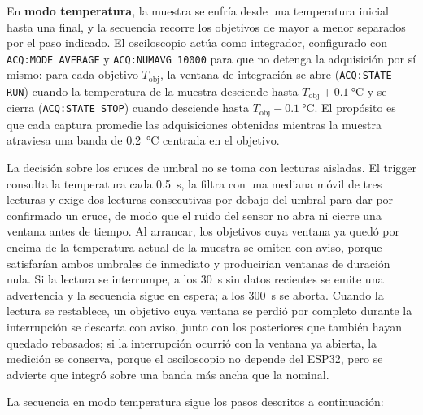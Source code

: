 En \textbf{modo temperatura}, la muestra se enfría desde una
temperatura inicial hasta una final, y la secuencia recorre los
objetivos de mayor a menor separados por el paso indicado. El
osciloscopio actúa como integrador, configurado con
\texttt{ACQ:MODE AVERAGE} y \texttt{ACQ:NUMAVG 10000} para que no
detenga la adquisición por sí mismo: para cada objetivo
$T_\text{obj}$, la ventana de integración se abre
(\texttt{ACQ:STATE RUN}) cuando la temperatura de la muestra desciende
hasta $T_\text{obj} + \SI{0.1}{\celsius}$ y se cierra
(\texttt{ACQ:STATE STOP}) cuando desciende hasta
$T_\text{obj} - \SI{0.1}{\celsius}$. El propósito es que cada captura
promedie las adquisiciones obtenidas mientras la muestra atraviesa una
banda de \SI{0.2}{\celsius} centrada en el objetivo.

La decisión sobre los cruces de umbral no se toma con lecturas
aisladas. El trigger consulta la temperatura cada \SI{0.5}{\second},
la filtra con una mediana móvil de tres lecturas y exige dos lecturas
consecutivas por debajo del umbral para dar por confirmado un cruce, de
modo que el ruido del sensor no abra ni cierre una ventana antes de
tiempo. Al arrancar, los objetivos cuya ventana ya quedó por encima de
la temperatura actual de la muestra se omiten con aviso, porque
satisfarían ambos umbrales de inmediato y producirían ventanas de
duración nula. Si la lectura se interrumpe, a los \SI{30}{\second} sin
datos recientes se emite una advertencia y la secuencia sigue en
espera; a los \SI{300}{\second} se aborta. Cuando la lectura se
restablece, un objetivo cuya ventana se perdió por completo durante la
interrupción se descarta con aviso, junto con los posteriores que
también hayan quedado rebasados; si la interrupción ocurrió con la
ventana ya abierta, la medición se conserva, porque el osciloscopio no
depende del ESP32, pero se advierte que integró sobre una banda más
ancha que la nominal.

La secuencia en modo temperatura sigue los pasos descritos a
continuación:

